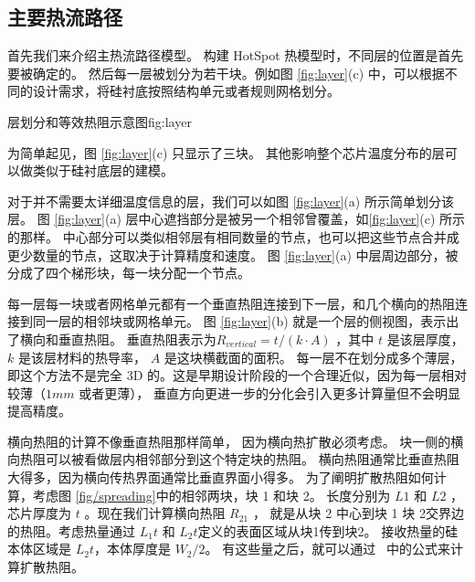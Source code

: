 
\subsection{主要热流路径}\label{sec:primary}

首先我们来介绍主热流路径模型。
构建 HotSpot 热模型时，不同层的位置是首先要被确定的。
然后每一层被划分为若干块。例如图 \ref{fig:layer}(c) 中，可以根据不同的设计需求，将硅衬底按照结构单元或者规则网格划分。
 \begin{pics}{层划分和等效热阻示意图}{fig:layer}
 \end{pics}
为简单起见，图 \ref{fig:layer}(c) 只显示了三块。
其他影响整个芯片温度分布的层可以做类似于硅衬底层的建模。

对于并不需要太详细温度信息的层，我们可以如图 \ref{fig:layer}(a) 所示简单划分该层。
图 \ref{fig:layer}(a) 层中心遮挡部分是被另一个相邻曾覆盖，如\ref{fig:layer}(c) 所示的那样。
中心部分可以类似相邻层有相同数量的节点，也可以把这些节点合并成更少数量的节点，这取决于计算精度和速度。
图 \ref{fig:layer}(a) 中层周边部分，被分成了四个梯形块，每一块分配一个节点。

每一层每一块或者网格单元都有一个垂直热阻连接到下一层，和几个横向的热阻连接到同一层的相邻块或网格单元。
图 \ref{fig:layer}(b) 就是一个层的侧视图，表示出了横向和垂直热阻。
垂直热阻表示为$R_{vertical} = t/(k \cdot A)$ ，其中 $t$ 是该层厚度， $k$ 是该层材料的热导率， $A$ 是这块横截面的面积。
每一层不在划分成多个薄层，即这个方法不是完全 3D 的。这是早期设计阶段的一个合理近似，因为每一层相对较薄（$1 mm$ 或者更薄），
垂直方向更进一步的分化会引入更多计算量但不会明显提高精度。

横向热阻的计算不像垂直热阻那样简单，
因为横向热扩散必须考虑。
块一侧的横向热阻可以被看做层内相邻部分到这个特定块的热阻。
横向热阻通常比垂直热阻大得多，因为横向传热界面通常比垂直界面小得多。
为了阐明扩散热阻如何计算，考虑图 \ref{fig/spreading}中的相邻两块，块 1 和块 2。
长度分别为 $L1$ 和 $L2$ ，芯片厚度为 $t$ 。现在我们计算横向热阻 $R_{21}$ ， 
就是从块 2 中心到块 1 块 2交界边的热阻。考虑热量通过 $L_1t$ 和 $L_2t$定义的表面区域从块1传到块2。
接收热量的硅本体区域是 $L_2t$，本体厚度是 $W_2/2$。
有这些量之后，就可以通过~\cite{song1995constriction} 中的公式来计算扩散热阻。

